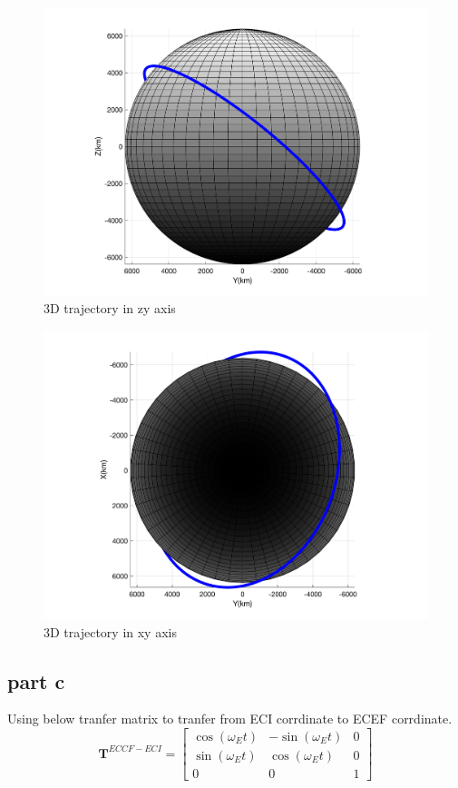     \begin{figure}[H]
        \caption{3D trajectory in zy axis}
        \centering
        \includegraphics[width=16cm]{../Figure/Short_project/yz_view.png}
    \end{figure}

    \begin{figure}[H]
        \caption{3D trajectory in xy axis}
        \centering
        \includegraphics[width=16cm]{../Figure/Short_project/xy_view.png}
    \end{figure}

    \subsection{part c}
    Using below tranfer matrix to tranfer from ECI corrdinate to ECEF corrdinate.
    $$
    \boldsymbol T^{ECCF-ECI} = \begin{bmatrix}
        \cos(\omega_Et) & -\sin(\omega_Et)& 0\\
        \sin(\omega_Et) &  \cos(\omega_Et)& 0\\
                0       &      0          & 1
    \end{bmatrix}
    $$

